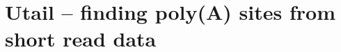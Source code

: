 \documentclass[]{ntnuthesis}
\begin{document}




\appendix
\chapter{Utail -- finding poly(A) sites from short read data}


\end{document}
